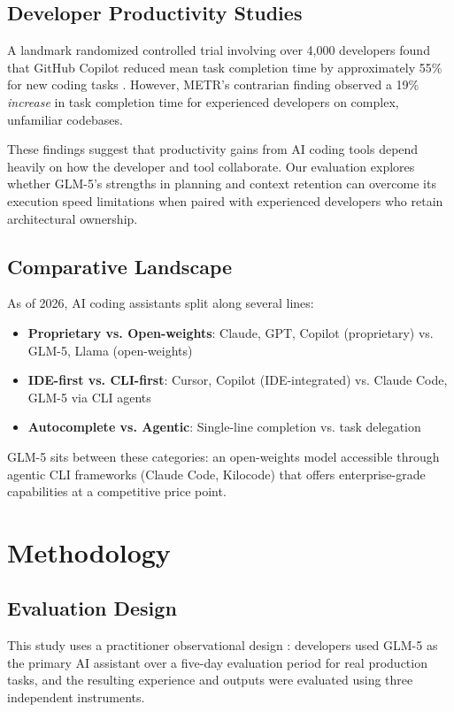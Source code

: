 \documentclass[conference]{IEEEtran}
\begin{document}
\subsection{Developer Productivity Studies}
A landmark randomized controlled trial involving over 4,000 developers found that GitHub Copilot reduced mean task completion time by approximately 55\% for new coding tasks \cite{peng2023copilot}. However, METR's contrarian finding \cite{metr2025} observed a 19\% \textit{increase} in task completion time for experienced developers on complex, unfamiliar codebases.

These findings suggest that productivity gains from AI coding tools depend heavily on how the developer and tool collaborate. Our evaluation explores whether GLM-5's strengths in planning and context retention can overcome its execution speed limitations when paired with experienced developers who retain architectural ownership.

\subsection{Comparative Landscape}
As of 2026, AI coding assistants split along several lines:

\begin{itemize}
    \item \textbf{Proprietary vs. Open-weights}: Claude, GPT, Copilot (proprietary) vs. GLM-5, Llama (open-weights)
    \item \textbf{IDE-first vs. CLI-first}: Cursor, Copilot (IDE-integrated) vs. Claude Code, GLM-5 via CLI agents
    \item \textbf{Autocomplete vs. Agentic}: Single-line completion vs. task delegation
\end{itemize}

GLM-5 sits between these categories: an open-weights model accessible through agentic CLI frameworks (Claude Code, Kilocode) that offers enterprise-grade capabilities at a competitive price point.

\section{Methodology}

\subsection{Evaluation Design}
This study uses a practitioner observational design \cite{creswell2018mixed}: developers used GLM-5 as the primary AI assistant over a five-day evaluation period for real production tasks, and the resulting experience and outputs were evaluated using three independent instruments.
\end{document}
